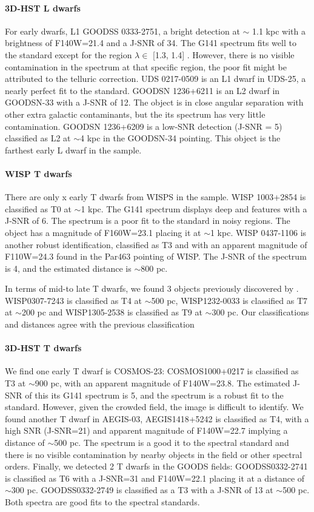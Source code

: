 \documentclass[manuscript]{aastex63}
\begin{document}
\paragraph{3D-HST L dwarfs}
For early dwarfs, L1 GOODSS 0333-2751, a bright detection at $\sim$ 1.1 kpc with a brightness of F140W=21.4 and a J-SNR of 34. The G141 spectrum fits well to the standard except for the region $\lambda \in$ [1.3, 1.4] \micron. However, there is no visible contamination in the spectrum at that specific region, the poor fit might be attributed to the telluric correction. UDS 0217-0509 is an L1 dwarf in UDS-25, a nearly perfect fit to the standard. GOODSN 1236+6211 is an L2 dwarf in GOODSN-33 with a J-SNR of 12. The object is in close angular separation with other extra galactic contaminants, but the its spectrum has very little contamination. GOODSN 1236+6209 is a low-SNR detection (J-SNR = 5) classified as L2 at $\sim$4 kpc in the GOODSN-34 pointing. This object is the farthest early L dwarf in the sample. 

\paragraph {WISP T dwarfs}
There are only x early T dwarfs from WISPS in the sample. WISP 1003+2854 is classified as T0 at $\sim$1 kpc. The G141 spectrum displays deep \wat and \meth features with a J-SNR of 6. The spectrum is a poor fit to the standard in noisy regions. The object has a magnitude of F160W=23.1 placing it at $\sim$1 kpc. WISP 0437-1106 is another robust identification, classified as T3 and with an apparent magnitude of F110W=24.3 found in the Par463 pointing of WISP. The J-SNR of the spectrum is 4, and the estimated distance is $\sim$800 pc.

In terms of mid-to late T dwarfs, we found 3 objects previously discovered by \cite{2012ApJ...752L..14M}. WISP0307-7243 is classified as T4 at $\sim$500 pc, WISP1232-0033 is classified as T7 at $\sim$200 pc and  WISP1305-2538 is classified as T9 at $\sim$300 pc. Our classifications and distances agree with the previous classification


\paragraph {3D-HST T dwarfs}

We find one early T dwarf is COSMOS-23: COSMOS1000+0217 is classified as T3 at $\sim$900 pc, with an apparent magnitude of F140W=23.8. The estimated J-SNR of this its G141 spectrum is 5, and the spectrum is a robust fit to the standard. However, given the crowded field, the image is difficult to identify. We found another T dwarf in AEGIS-03, AEGIS1418+5242 is classified as T4, with a high SNR (J-SNR=21) and apparent magnitude of F140W=22.7 implying a distance of $\sim$500 pc. The spectrum is a good it to the spectral standard and there is no visible contamination by nearby objects in the field or other spectral orders. Finally, we detected 2 T dwarfs in the GOODS fields: GOODSS0332-2741 is classified as T6 with a J-SNR=31 and F140W=22.1 placing it at a distance of $\sim$300 pc. GOODSS0332-2749 is classified as a T3 with a J-SNR of 13 at $\sim$500 pc. Both spectra are good fits to the spectral standards. 
\end{document}
